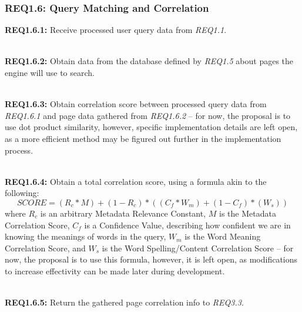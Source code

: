 \subsubsection{REQ1.6: Query Matching and Correlation}

\textbf{REQ1.6.1:} Receive processed user query data from \textit{REQ1.1}.\par

\textbf{\\REQ1.6.2:} Obtain data from the database defined by \textit{REQ1.5} about pages the engine will use to search.\par

\textbf{\\REQ1.6.3:} Obtain correlation score between processed query data from \textit{REQ1.6.1} and page data gathered from \textit{REQ1.6.2} -- 
for now, the proposal is to use dot product similarity, however, specific implementation details are left open, as a more efficient method may be figured out further in the implementation process.\par

\textbf{\\REQ1.6.4:} Obtain a total correlation score, using a formula akin to the following: 
\[ SCORE = (R_c * M) + (1 - R_c) * ((C_f * W_m) + (1 - C_f) * (W_s)) \]
where \(R_c\) is an arbitrary Metadata Relevance Constant, \(M\) is the Metadata Correlation Score, \(C_f\) is a Confidence Value, describing how confident we are in knowing the meanings of words in the query, 
\(W_m\) is the Word Meaning Correlation Score, and \(W_s\) is the Word Spelling/Content Correlation Score -- 
for now, the proposal is to use this formula, however, it is left open, as modifications to increase effectivity can be made later during development.\par

\textbf{\\REQ1.6.5:} Return the gathered page correlation info to \textit{REQ3.3}.\par


